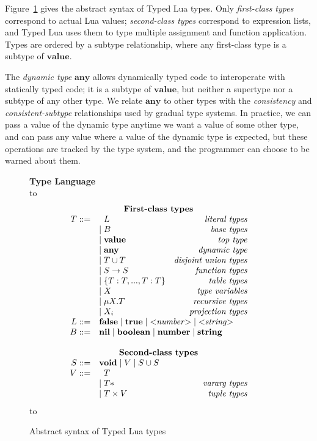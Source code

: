 \documentclass[preprint]{sig-alternate}
\newcommand{\Any}{\mathbf{any}}
\newcommand{\Top}{\mathbf{value}}
\newcommand{\Nil}{\mathbf{nil}}
\newcommand{\False}{\mathbf{false}}
\newcommand{\True}{\mathbf{true}}
\newcommand{\Boolean}{\mathbf{boolean}}
\newcommand{\Number}{\mathbf{number}}
\newcommand{\String}{\mathbf{string}}
\newcommand{\Void}{\mathbf{void}}
\def\dstart{\hbox to \hsize{\vrule depth 4pt\hrulefill\vrule depth 4pt}}
\def\dend{\hbox to \hsize{\vrule height 4pt\hrulefill\vrule height 4pt}}
\begin{document}
Figure~\ref{fig:typelang} gives the abstract syntax of Typed Lua
types. Only {\em first-class types} correspond to actual Lua
values; {\em second-class types} correspond to expression lists,
and Typed Lua uses them to type multiple assignment and function
application. Types are ordered by a subtype relationship, where
any first-class type is a subtype of $\Top$.

The {\em dynamic type} $\Any$ allows dynamically typed code to
interoperate with statically typed code; it is a subtype of $\Top$, but
neither a supertype nor a subtype of any other type. We relate $\Any$
to other types with the {\em consistency} and {\em consistent-subtype}
relationships used by gradual type systems. In practice, we can
pass a value of the dynamic type anytime we want a value of some
other type, and can pass any value where a value of the dynamic type
is expected, but these operations are tracked by the type system,
and the programmer can choose to be warned about them.

\begin{figure}[!ht]
\textbf{Type Language}\\
\dstart
$$
\begin{array}{rlr}
\multicolumn{3}{c}{\textbf{First-class types}} \\
T ::= & \;\; L & \textit{literal types}\\
& | \; B & \textit{base types}\\
& | \; \Top & \textit{top type}\\
& | \; \Any & \textit{dynamic type}\\
& | \; T \cup T & \textit{disjoint union types}\\
& | \; S \rightarrow S & \textit{function types}\\
& | \; \{T:T, ..., T:T\} & \textit{table types}\\
& | \; X & \textit{type variables}\\
& | \; \mu X.T & \textit{recursive types}\\
& | \; X_i & \textit{projection types}\\
L ::= & \multicolumn{2}{l}{\False \; | \; \True \; | \; {<}{\it number}{>} \; | \; {<}{\it string}{>} } \\
B ::= & \multicolumn{2}{l}{\Nil \; | \; \Boolean \; | \; \Number \; | \; \String} \\
\multicolumn{3}{c}{} \\
\multicolumn{3}{c}{\textbf{Second-class types}} \\
S ::= &  \multicolumn{2}{l}{\Void \; |\; V \; | \; S \cup S} \\
V ::= & \;\; T & \\
& | \; T* & \textit{vararg types}\\
& | \; T \times V & \textit{tuple types}
\end{array}
$$
\dend
\caption{Abstract syntax of Typed Lua types}
\label{fig:typelang}
\end{figure}
\end{document}
